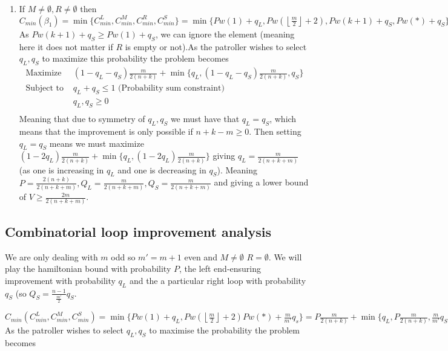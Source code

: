 \documentclass[a4paper,10pt]{article}
\newcommand{\floor}[1]{\left \lfloor #1 \right \rfloor}
\theoremstyle{definition}
\theoremstyle{definition}
\theoremstyle{remark}
\theoremstyle{definition}
\begin{document}
\begin{enumerate}
\item If $M \neq \emptyset , R \neq \emptyset$ then $C_{min} (\beta_{1})=\min \{ C_{min}^{L} , C_{min}^{M} , C_{min}^{R}, C_{min}^{S} \}=\min \{ Pw(1)+q_{L}, Pw(\floor{\frac{m}{2}}+2), Pw(k+1)+q_{S}, Pw(*)+q_{S} \}=\min \{ Pw(1)+q_{L}, Pw(\floor{\frac{m}{2}}+2), Pw(*)+q_{S} \}=P \frac{m}{2(n+k)} + \min \{ q_{L}, P \frac{m}{2(n+k)} , q_{S}  \}$ As $Pw(k+1)+q_{S} \geq Pw(1)+q_{S}$, we can ignore the element (meaning here it does not matter if $R$ is empty or not).As the patroller wishes to select $q_{L},q_{S}$ to maximize this probability the problem becomes
$$\begin{array}{cc}
\text{Maximize} & (1-q_{L}-q_{S}) \frac{m}{2(n+k)} + \min \{ q_{L}, (1-q_{L}-q_{S}) \frac{m}{2(n+k)} , q_{S} \}\\
\text{Subject to } & q_{L}+q_{S} \leq 1 \text{  (Probability sum constraint)} \\
     & q_{L},q_{S} \geq 0 \\
\end{array} $$
Meaning that due to symmetry of $q_{L},q_{S}$ we must have that $q_{L}=q_{S}$, which means that the improvement is only possible if $n+k-m \geq 0$. Then setting $q_{L}=q_{S}$ means we must maximize $(1-2q_{L})\frac{m}{2(n+k)} + \min \{ q_{L} , (1-2q_{L}) \frac{m}{2(n+k)} \}$ giving $q_{L}=\frac{m}{2(n+k+m)}$ (as one is increasing in $q_{L}$ and one is decreasing in $q_{S}$). Meaning $P=\frac{2(n+k)}{2(n+k+m)},Q_{L}=\frac{m}{2(n+k+m)},Q_{S}=\frac{m}{2(n+k+m)}$ and giving a lower bound of $V \geq \frac{2m}{2(n+k+m)}$.
\end{enumerate}

\subsection{Combinatorial loop improvement analysis}
\label{appendix: Combinatorial loop improvement analysis}
We are only dealing with $m$ odd so $m'=m+1$ even and $M \neq \emptyset$ $R = \emptyset$. We will play the hamiltonian bound with probability $P$, the left end-ensuring improvement with probability $q_{L}$ and the a particular right loop with probability $q_{S}$ (so $Q_{S}=\frac{n-1}{\frac{m'}{2}}q_{S}$.

$C_{min}(C_{min}^{L},C_{min}^M,C_{min}^S)=\min\{Pw(1)+q_{L},Pw(\floor{\frac{m}{2}}+2) Pw(*)+\frac{m}{m'}q_{s}\}=P\frac{m}{2(n+k)}+\min\{q_{L},P\frac{m}{2(n+k)},\frac{m}{m'}q_{S} \}$ As the patroller wishes to select $q_{L},q_{S}$ to maximise the probability the problem becomes
\end{document}
